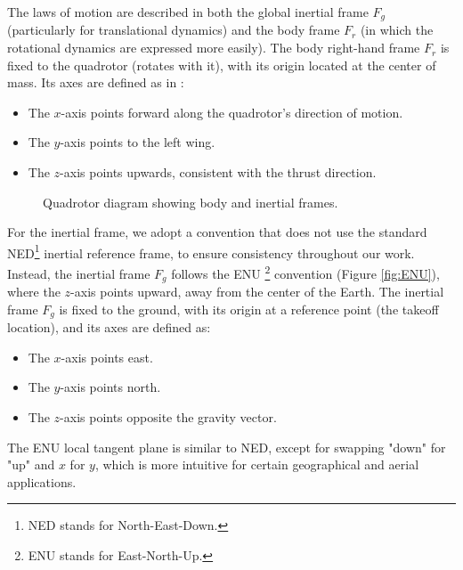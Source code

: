 The laws of motion are described in both the global inertial frame \( F_g \) 
(particularly for translational dynamics) and the body frame 
\( F_r \) (in which the rotational dynamics are expressed more 
easily). The body right-hand frame \( F_r \) is fixed to the quadrotor 
(rotates with it), with its 
origin located at the center of mass.
Its axes are defined as in \cite{model_quadrotor}:
\noindent
\begin{itemize}
    \item The \( x \)-axis points forward along the quadrotor's direction 
    of motion.
    \item The \( y \)-axis points to the left wing.
    \item The \( z \)-axis points upwards, consistent with 
    the thrust direction.
\end{itemize}
\begin{figure}[h]
    \centering
    \caption{Quadrotor diagram showing body and inertial frames.}
    \label{fig:quadrotor_diagram}
\end{figure}

\noindent
For the inertial frame, we adopt a convention that does not use 
the standard NED\footnote{NED stands for North-East-Down.} inertial 
reference frame, to ensure consistency throughout our work. 
Instead, the inertial frame \( F_g \) follows the ENU 
\footnote{ENU stands for East-North-Up.} 
convention (Figure \ref{fig:ENU}), where the 
\( z \)-axis points upward, away from the center of the Earth. The 
inertial frame \( F_g \) is fixed to the ground, with its origin at a 
reference point (the takeoff location), and its axes are defined as:
\begin{itemize}
    \item The \( x \)-axis points east.
    \item The \( y \)-axis points north.
    \item The \( z \)-axis points opposite the gravity vector.
\end{itemize}
The ENU local tangent plane is similar to NED, except for swapping 
"down" for "up" and \( x \) for \( y \), which is more intuitive for certain 
geographical and aerial applications.


